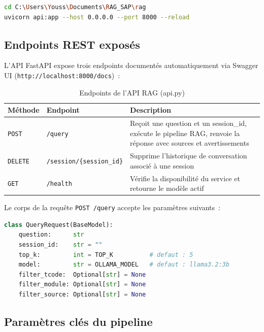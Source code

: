 \begin{lstlisting}[language=sh, caption={Commande de démarrage de l'API RAG}]
cd C:\Users\Youss\Documents\RAG_SAP\rag
uvicorn api:app --host 0.0.0.0 --port 8000 --reload
\end{lstlisting}

\subsection{Endpoints REST exposés}

L'API FastAPI expose trois endpoints documentés automatiquement via Swagger UI (\texttt{http://localhost:8000/docs})~:

\begin{table}[H]
\centering
\caption{Endpoints de l'API RAG (api.py)}
\label{tab:api_endpoints}
\begin{tabularx}{\textwidth}{|l|l|X|}
\hline
\textbf{Méthode} & \textbf{Endpoint} & \textbf{Description} \\
\hline
\texttt{POST} & \texttt{/query} & Reçoit une question et un session\_id, exécute le pipeline RAG, renvoie la réponse avec sources et avertissements \\
\hline
\texttt{DELETE} & \texttt{/session/\{session\_id\}} & Supprime l'historique de conversation associé à une session \\
\hline
\texttt{GET} & \texttt{/health} & Vérifie la disponibilité du service et retourne le modèle actif \\
\hline
\end{tabularx}
\end{table}

Le corps de la requête \texttt{POST /query} accepte les paramètres suivants~:

\begin{lstlisting}[language=Python, caption={Schéma de la requête POST /query (api.py)}]
class QueryRequest(BaseModel):
    question:      str
    session_id:    str = ""
    top_k:         int = TOP_K          # defaut : 5
    model:         str = OLLAMA_MODEL   # defaut : llama3.2:3b
    filter_tcode:  Optional[str] = None
    filter_module: Optional[str] = None
    filter_source: Optional[str] = None
\end{lstlisting}

\subsection{Paramètres clés du pipeline}

